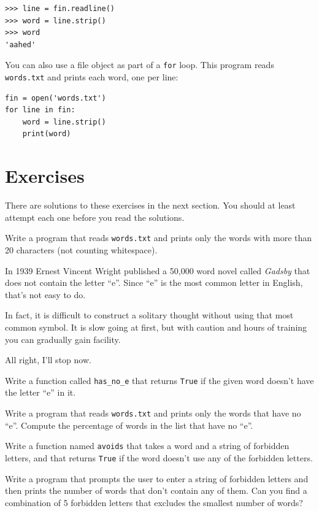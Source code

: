 \documentclass[10pt]{book}
\begin{document}
\begin{verbatim}
>>> line = fin.readline()
>>> word = line.strip()
>>> word
'aahed'
\end{verbatim}
%
You can also use a file object as part of a {\tt for} loop.
This program reads {\tt words.txt} and prints each word, one
per line:

\begin{verbatim}
fin = open('words.txt')
for line in fin:
    word = line.strip()
    print(word)
\end{verbatim}
%

\section{Exercises}

There are solutions to these exercises in the next section.
You should at least attempt each one before you read the solutions.

\begin{exercise}
Write a program that reads {\tt words.txt} and prints only the
words with more than 20 characters (not counting whitespace).

\end{exercise}

\begin{exercise}

In 1939 Ernest Vincent Wright published a 50,000 word novel called
{\em Gadsby} that does not contain the letter ``e''.  Since ``e'' is
the most common letter in English, that's not easy to do.

In fact, it is difficult to construct a solitary thought without using
that most common symbol.  It is slow going at first, but with caution
and hours of training you can gradually gain facility.

All right, I'll stop now.

Write a function called \verb"has_no_e" that returns {\tt True} if
the given word doesn't have the letter ``e'' in it.

Write a program that reads {\tt words.txt} and prints only the words
that have no ``e''.  Compute the percentage of words in the list
that have no ``e''.

\end{exercise}


\begin{exercise} 

Write a function named {\tt avoids}
that takes a word and a string of forbidden letters, and
that returns {\tt True} if the word doesn't use any of the forbidden
letters.

Write a program that prompts the user to enter a string
of forbidden letters and then prints the number of words that
don't contain any of them.
Can you find a combination of 5 forbidden letters that
excludes the smallest number of words?

\end{exercise}
\end{document}
